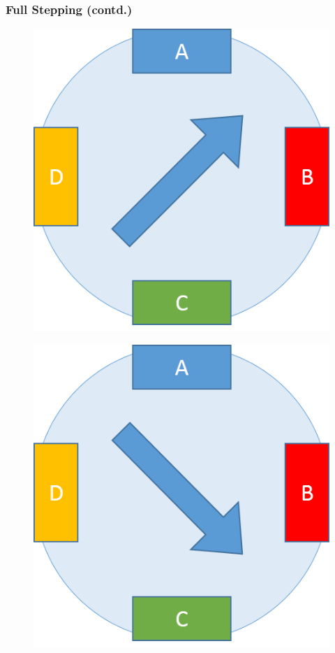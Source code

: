 \documentclass[table,10pt,red]{beamer}	%
\begin{document}
\begin{frame}
	\frametitle{Full Stepping (contd.)}
	\begin{minipage}[c]{0.24\textwidth}
		\begin{figure}
			\includegraphics[width=0.9\linewidth]{step2}
		\end{figure}
	\end{minipage}
	\begin{minipage}[c]{0.24\textwidth}
		\begin{figure}
			\includegraphics[width=0.9\linewidth]{step4}

\end{figure}
\end{minipage}
\end{frame}
\end{document}
